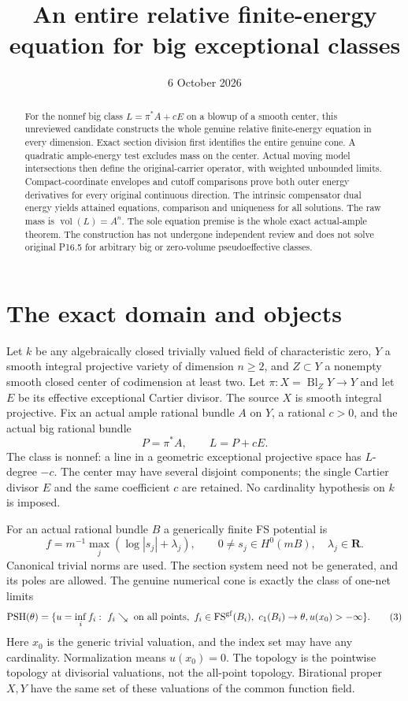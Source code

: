 \documentclass[11pt]{article}
\title{An entire relative finite-energy equation for big exceptional classes}
\author{}
\date{6 October 2026}
\newcommand{\PSH}{\operatorname{PSH}}
\newcommand{\FS}{\operatorname{FS}}
\begin{document}
\maketitle
\begin{abstract}
For the nonnef big class $L=\pi^*A+cE$ on a blowup of a smooth
center, this unreviewed candidate constructs the whole genuine
relative finite-energy equation in every dimension. Exact section
division first identifies the entire genuine cone. A quadratic
ample-energy test excludes mass on the center. Actual moving model
intersections then define the original-carrier operator, with
weighted unbounded limits. Compact-coordinate envelopes and cutoff
comparisons prove both outer energy derivatives for every original
continuous direction. The intrinsic compensator dual energy yields
attained equations, comparison and uniqueness for all solutions.
The raw mass is $\operatorname{vol}(L)=A^n$. The sole equation
premise is the whole exact actual-ample theorem. The construction
has not undergone independent review and does not solve original
P16.5 for arbitrary big or zero-volume pseudoeffective classes.
\end{abstract}

\section{The exact domain and objects}
Let $k$ be any algebraically closed trivially valued field of
characteristic zero, $Y$ a smooth integral projective variety of
dimension $n\geq2$, and $Z\subset Y$ a nonempty smooth closed
center of codimension at least two. Let
$\pi:X=\operatorname{Bl}_Z Y\to Y$ and let $E$ be its
effective exceptional Cartier divisor. The source $X$ is smooth
integral projective. Fix an actual ample rational bundle $A$ on $Y$,
a rational $c>0$, and the actual big rational bundle
\[
 P=\pi^*A,\qquad L=P+cE.                                  \tag{1}
\]
The class is nonnef: a line in a geometric exceptional projective
space has $L$-degree $-c$. The center may have several disjoint
components; the single Cartier divisor $E$ and the same coefficient
$c$ are retained. No cardinality hypothesis on $k$ is imposed.

For an actual rational bundle $B$ a generically finite FS potential is
\[
 f=m^{-1}\max_j(\log|s_j|+\lambda_j),\qquad
 0\ne s_j\in H^0(mB),\quad \lambda_j\in\mathbf R.          \tag{2}
\]
Canonical trivial norms are used. The section system need not be
generated, and its poles are allowed. The genuine numerical cone is
exactly the class of one-net limits
\[
 \PSH(\theta)=\{u=\inf_i f_i:\ f_i\searrow\text{ on all points},
  \ f_i\in\FS^{\rm gf}(B_i),\ c_1(B_i)\to\theta,
                         u(x_0)>-\infty\}.               \tag{3}
\]
Here $x_0$ is the generic trivial valuation, and the index set may
have any cardinality. Normalization means $u(x_0)=0$. The topology
is the pointwise topology at divisorial valuations, not the all-point
topology. Birational proper $X,Y$ have the same set of these
valuations of the common function field.
\end{document}
